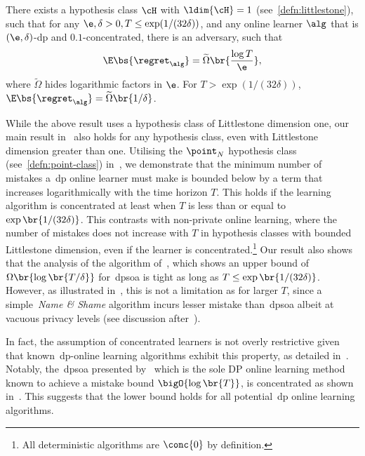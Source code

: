 \begin{corollary}\label{thm:informal-small}
     There exists a hypothesis class \(\cH\) with \(\ldim{\cH}=1\) (see~\cref{defn:littlestone}), such that for any \(\e, \delta > 0, T \leq \exp(1/(32\delta))\), and any online learner \(\alg\) that is \((\e, \delta)\)-\Gls{dp} and \(0.1\)-concentrated, there is an adversary, such that 
    \begin{equation}
        \E\bs{\regret_{\alg}} =\widetilde\Omega\br{\frac{\log T}{\e}},
        \end{equation}
    where \(\widetilde \Omega\) hides logarithmic factors in \(\e\). For \(T > \exp(1/(32\delta))\), \(\E\bs{\regret_{\alg}} = \widetilde\Omega\br{1 / \delta}\).
\end{corollary}

 While the above result uses a hypothesis class of Littlestone dimension one, our main result in~ also holds for any hypothesis class, even with Littlestone dimension greater than one. Utilising the \(\point_N\) hypothesis class (see~\cref{defn:point-class}) in~, we demonstrate that the minimum number of mistakes a~\Gls{dp} online learner must make is bounded below by a term that increases logarithmically with the time horizon \(T\). This holds if the learning algorithm is concentrated at least when \(T\) is less than or equal to \(\exp\br{1 / (32\delta)}\). This contrasts with non-private online learning, where the number of mistakes does not increase with \(T\) in hypothesis classes with bounded Littlestone dimension, even if the learner is concentrated.\footnote{All deterministic algorithms are \(\conc{0}\) by definition.} Our result also shows that the analysis of the algorithm of~\citet{golowich2021littlestone}, which shows an upper bound of~\(\Omega\br{\log \br{T/\delta}}\) for~\Gls{dpsoa} is tight as long as \(T\leq\exp\br{1 / (32\delta)}\). However, as illustrated in~, this is not a limitation as for larger \(T\), since a simple~\emph{Name \& Shame} algorithm incurs lesser mistake than~\Gls{dpsoa} albeit at vacuous privacy levels (see discussion after~). 


In fact, the assumption of concentrated learners is not overly restrictive given that known~\Gls{dp}-online learning algorithms exhibit this property, as detailed in~. Notably, the~\Gls{dpsoa} presented by~\citet{golowich2021littlestone} which is the sole DP online learning method known to achieve a mistake bound \(\bigO{\log\br{T}}\), is concentrated as shown in~. This suggests that the lower bound holds for all potential~\Gls{dp} online learning algorithms.


